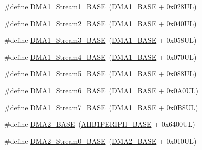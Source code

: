 \begin{DoxyCompactItemize}
\item 
\#define \hyperlink{group___peripheral__memory__map_ga5b4152cef577e37eccc9311d8bdbf3c2}{D\+M\+A1\+\_\+\+Stream1\+\_\+\+B\+A\+SE}~(\hyperlink{group___peripheral__memory__map_gab2d8a917a0e4ea99a22ac6ebf279bc72}{D\+M\+A1\+\_\+\+B\+A\+SE} + 0x028\+U\+L)
\item 
\#define \hyperlink{group___peripheral__memory__map_ga48a551ee91d3f07dd74347fdb35c703d}{D\+M\+A1\+\_\+\+Stream2\+\_\+\+B\+A\+SE}~(\hyperlink{group___peripheral__memory__map_gab2d8a917a0e4ea99a22ac6ebf279bc72}{D\+M\+A1\+\_\+\+B\+A\+SE} + 0x040\+U\+L)
\item 
\#define \hyperlink{group___peripheral__memory__map_gac51deb54ff7cfe1290dfcf517ae67127}{D\+M\+A1\+\_\+\+Stream3\+\_\+\+B\+A\+SE}~(\hyperlink{group___peripheral__memory__map_gab2d8a917a0e4ea99a22ac6ebf279bc72}{D\+M\+A1\+\_\+\+B\+A\+SE} + 0x058\+U\+L)
\item 
\#define \hyperlink{group___peripheral__memory__map_ga757a3c0d866c0fe68c6176156065a26b}{D\+M\+A1\+\_\+\+Stream4\+\_\+\+B\+A\+SE}~(\hyperlink{group___peripheral__memory__map_gab2d8a917a0e4ea99a22ac6ebf279bc72}{D\+M\+A1\+\_\+\+B\+A\+SE} + 0x070\+U\+L)
\item 
\#define \hyperlink{group___peripheral__memory__map_ga0ded7bed8969fe2e2d616e7f90eb7654}{D\+M\+A1\+\_\+\+Stream5\+\_\+\+B\+A\+SE}~(\hyperlink{group___peripheral__memory__map_gab2d8a917a0e4ea99a22ac6ebf279bc72}{D\+M\+A1\+\_\+\+B\+A\+SE} + 0x088\+U\+L)
\item 
\#define \hyperlink{group___peripheral__memory__map_ga58998ddc40adb6361704d6c9dad08125}{D\+M\+A1\+\_\+\+Stream6\+\_\+\+B\+A\+SE}~(\hyperlink{group___peripheral__memory__map_gab2d8a917a0e4ea99a22ac6ebf279bc72}{D\+M\+A1\+\_\+\+B\+A\+SE} + 0x0\+A0\+U\+L)
\item 
\#define \hyperlink{group___peripheral__memory__map_ga82186dd6d3f60995d428b34c041919d7}{D\+M\+A1\+\_\+\+Stream7\+\_\+\+B\+A\+SE}~(\hyperlink{group___peripheral__memory__map_gab2d8a917a0e4ea99a22ac6ebf279bc72}{D\+M\+A1\+\_\+\+B\+A\+SE} + 0x0\+B8\+U\+L)
\item 
\#define \hyperlink{group___peripheral__memory__map_gab72a9ae145053ee13d1d491fb5c1df64}{D\+M\+A2\+\_\+\+B\+A\+SE}~(\hyperlink{group___peripheral__memory__map_ga811a9a4ca17f0a50354a9169541d56c4}{A\+H\+B1\+P\+E\+R\+I\+P\+H\+\_\+\+B\+A\+SE} + 0x6400\+U\+L)
\item 
\#define \hyperlink{group___peripheral__memory__map_gac4c67b24726ba6b94d03adb351bcec4d}{D\+M\+A2\+\_\+\+Stream0\+\_\+\+B\+A\+SE}~(\hyperlink{group___peripheral__memory__map_gab72a9ae145053ee13d1d491fb5c1df64}{D\+M\+A2\+\_\+\+B\+A\+SE} + 0x010\+U\+L)

\end{DoxyCompactItemize}

